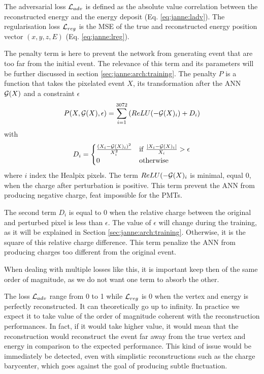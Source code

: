 \documentclass[../main.tex]{subfiles}
\begin{document}
The adversarial loss ${\cal L}_{adv}$ is defined as the absolute value correlation between the reconstructed energy and the energy deposit (Eq. \ref{eq:janne:ladv}). The regularisation loss ${\cal L}_{reg}$ is the MSE of the true and reconstructed energy position vector $(x, y, z, E)$ (Eq. \ref{eq:janne:lreg}).

The penalty term is here to prevent the network from generating event that are too far from the initial event. The relevance of this term and its parameters will be further discussed in section
\ref{sec:janne:arch:training}. The penalty $P$ is a function that takes the pixelated event $X$, its transformation after the ANN ${\cal G}(X)$ and a constraint $\epsilon$
\begin{equation}
  P(X, {\cal G}(X), \epsilon) = \sum_{i=1}^{3072} \left( ReLU(-{\cal G}(X)_i) + D_i \right)
\end{equation}
with
\begin{equation}
  D_i = \begin{cases}
    \frac{(X_i - {\cal G}(X)_i)^2}{X_i^2}& \text{if } \frac{|X_i - {\cal G}(X)_i|}{X_i} > \epsilon \\
    0& \text{otherwise}
  \end{cases}
\end{equation}
where $i$ index the Healpix pixels. The term $ReLU(-{\cal G}(X)_i$ is minimal, equal 0, when the charge after perturbation is positive. This term prevent the ANN from producing negative charge, feat impossible for the PMTs.

The second term $D_i$ is equal to 0 when the relative charge between the original and perturbed pixel is less than $\epsilon$. The value of $\epsilon$ will change during the training, as it will be explained in Section \ref{sec:janne:arch:training}. Otherwise, it is the square of this relative charge difference. This term penalize the ANN from producing charges too different from the original event.
\hfill

When dealing with multiple losses like this, it is important keep then of the same order of magnitude, as we do not want one term to absorb the other.

The loss ${\cal L}_{adv}$ range from 0 to 1 while ${\cal L}_{reg}$ is 0 when the vertex and energy is perfectly reconstructed. It can theoretically go up to infinity. In practice we expect it to take value of the order of magnitude coherent with the reconstruction performances. In fact, if it would take higher value, it would mean that the reconstruction would reconstruct the event far away from the true vertex and energy in comparison to the expected performance. This kind of issue would be immediately be detected, even with simplistic reconstructions such as the charge barycenter, which goes against the goal of producing subtle fluctuation.
\end{document}
